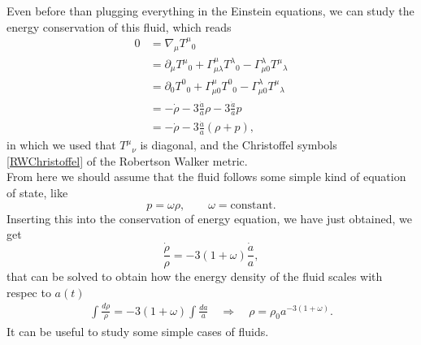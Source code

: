 Even before than plugging everything in the Einstein equations, we can study the energy conservation of this fluid, which reads
\begin{align}
    0&=\nabla_\mu T^\mu\phantom{} _0\nonumber\\&=\partial_\mu T^\mu\phantom{} _0+\Gamma^\mu_{\mu\lambda}T^\lambda\phantom{} _0-\Gamma^\lambda_{\mu0}T^\mu\phantom{} _\lambda\nonumber\\
    &=\partial_0 T^0\phantom{} _0+\Gamma^\mu_{\mu0}T^0\phantom{} _0-\Gamma^\lambda_{\mu0}T^\mu\phantom{} _\lambda\nonumber\\
    &=-\dot\rho-3\frac{\dot a}{a}\rho-3\frac{\dot a}{a}p\nonumber\\
    &=-\dot\rho-3\frac{\dot a}{a}(\rho+p),
\end{align}
in which we used that $T^\mu\phantom{}_\nu$ is diagonal, and the Christoffel symbols \eqref{RWChristoffel} of the Robertson Walker metric.\\
From here we should assume that the fluid follows some simple kind of equation of state, like
\begin{equation}
    p=\omega\rho,\qquad\omega=\text{constant}.
\end{equation}
Inserting this into the conservation of energy equation, we have just obtained, we get
\begin{equation}
    \frac{\dot\rho}{\rho}=-3(1+\omega)\frac{\dot a }{a},
\end{equation}
that can be solved to obtain how the energy density of the fluid scales with respec to $a(t)$
\begin{align}
    \int \frac{d\rho}{\rho}=-3(1+\omega)\int \frac{da}{a} \quad\Rightarrow\quad \boxed{\rho=\rho_0a^{-3(1+\omega)}}.
\end{align}
It can be useful to study some simple cases of fluids.
